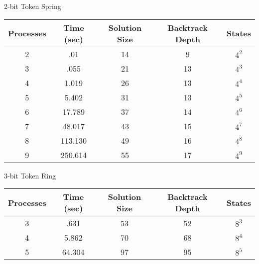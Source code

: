\begin{center}
2-bit Token Spring \\
\begin{tabular}{|c|c|c|c|c|}
\hline
 Processes & Time (sec) & Solution Size & Backtrack Depth & States \\
\hline         
 2 & .01 & 14 & 9 & $4^{2}$         \\
 3 & .055 & 21 & 13 & $4^{3}$       \\
 4 & 1.019 & 26 & 13 & $4^{4}$      \\
 5 & 5.402 & 31 & 13 & $4^{5}$      \\
 6 & 17.789 & 37 & 14 & $4^{6}$     \\
 7 & 48.017 & 43 & 15 & $4^{7}$     \\
 8 & 113.130 & 49 & 16 & $4^{8}$    \\
 9 & 250.614 & 55 & 17 & $4^{9}$    \\
\hline
\end{tabular}
\end{center}

\begin{center}
3-bit Token Ring \\
\begin{tabular}{|c|c|c|c|c|}
\hline
 Processes & Time (sec) & Solution Size & Backtrack Depth & States \\
\hline         
 3 & .631 & 53 & 52 & $8^{3}$       \\
 4 & 5.862 & 70 & 68 & $8^{4}$      \\
 5 & 64.304 & 97 & 95 & $8^{5}$      \\
\hline
\end{tabular}
\end{center}

